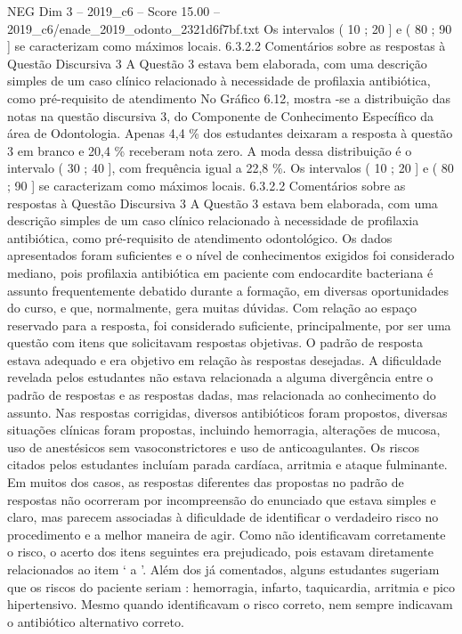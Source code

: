 \begin{textsample}{NEG Dim 3 – 2019\_c6 – Score 15.00 – 2019\_c6/enade\_2019\_odonto\_2321d6f7bf.txt}
Os intervalos ( 10 ; 20 ] e ( 80 ; 90 ] se caracterizam como máximos locais. 6.3.2.2 Comentários sobre as respostas à Questão Discursiva 3 A Questão 3 estava bem elaborada, com uma descrição simples de um caso clínico relacionado à necessidade de profilaxia antibiótica, como pré-requisito de atendimento No Gráfico 6.12, mostra -se a distribuição das notas na questão discursiva 3, do Componente de Conhecimento Específico da área de Odontologia.
Apenas 4,4 \% dos estudantes deixaram a resposta à questão 3 em branco e 20,4 \% receberam nota zero.
A moda dessa distribuição é o intervalo ( 30 ; 40 ], com frequência igual a 22,8 \%.
Os intervalos ( 10 ; 20 ] e ( 80 ; 90 ] se caracterizam como máximos locais. 6.3.2.2 Comentários sobre as respostas à Questão Discursiva 3 A Questão 3 estava bem elaborada, com uma descrição simples de um caso clínico relacionado à necessidade de profilaxia antibiótica, como pré-requisito de atendimento odontológico.
Os dados apresentados foram suficientes e o nível de conhecimentos exigidos foi considerado mediano, pois profilaxia antibiótica em paciente com endocardite bacteriana é assunto frequentemente debatido durante a formação, em diversas oportunidades do curso, e que, normalmente, gera muitas dúvidas.
Com relação ao espaço reservado para a resposta, foi considerado suficiente, principalmente, por ser uma questão com itens que solicitavam respostas objetivas.
O padrão de resposta estava adequado e era objetivo em relação às respostas desejadas.
A dificuldade revelada pelos estudantes não estava relacionada a alguma divergência entre o padrão de respostas e as respostas dadas, mas relacionada ao conhecimento do assunto.
Nas respostas corrigidas, diversos antibióticos foram propostos, diversas situações clínicas foram propostas, incluindo hemorragia, alterações de mucosa, uso de anestésicos sem vasoconstrictores e uso de anticoagulantes.
Os riscos citados pelos estudantes incluíam parada cardíaca, arritmia e ataque fulminante.
Em muitos dos casos, as respostas diferentes das propostas no padrão de respostas não ocorreram por incompreensão do enunciado que estava simples e claro, mas parecem associadas à dificuldade de identificar o verdadeiro risco no procedimento e a melhor maneira de agir.
Como não identificavam corretamente o risco, o acerto dos itens seguintes era prejudicado, pois estavam diretamente relacionados ao item ‘ a ’.
Além dos já comentados, alguns estudantes sugeriam que os riscos do paciente seriam : hemorragia, infarto, taquicardia, arritmia e pico hipertensivo.
Mesmo quando identificavam o risco correto, nem sempre indicavam o antibiótico alternativo correto.

\end{textsample}
